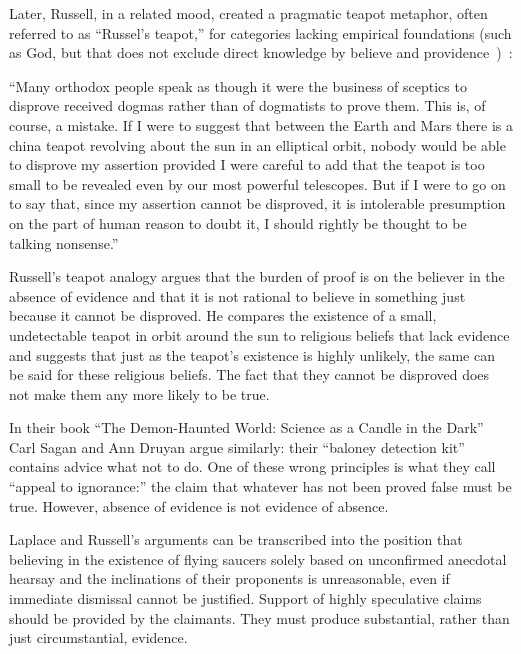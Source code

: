 Later, Russell, in a related mood, created a pragmatic teapot metaphor, often referred to as ``Russel's teapot,''
for categories lacking empirical foundations (such as God,
but that does not exclude direct knowledge by believe and providence~\cite{Sagan-Contact})~\cite{Russell1952}:
\begin{svgraybox}
``Many orthodox people speak as though it were the business of sceptics
to disprove received dogmas rather than of dogmatists to prove them. This
is, of course, a mistake. If I were to suggest that between the Earth and
Mars there is a china teapot revolving about the sun in an elliptical orbit,
nobody would be able to disprove my assertion provided I were careful to
add that the teapot is too small to be revealed even by our most powerful
telescopes. But if I were to go on to say that, since my assertion cannot be
disproved, it is intolerable presumption on the part of human reason to
doubt it, I should rightly be thought to be talking nonsense.''
\end{svgraybox}

Russell's teapot analogy argues that the burden of proof is on the believer in the absence of evidence
and that it is not rational to believe in something just because it cannot be disproved.
He compares the existence of a small, undetectable teapot in orbit around the sun to religious beliefs
that lack evidence and suggests that just as the teapot's existence is highly unlikely, the same can be said for these religious beliefs.
The fact that they cannot be disproved does not make them any more likely to be true.

In their book ``The Demon-Haunted World: Science as a Candle in the Dark''~\cite{Sagan1997Feb}  Carl Sagan  and Ann Druyan
argue similarly: their ``baloney detection kit'' contains advice what not to do. One of these wrong principles is
what they call ``appeal to ignorance:'' the claim that whatever has not been proved false must be true.
However, absence of evidence is not evidence of absence.

Laplace and Russell's arguments can be transcribed into the position that
believing in the existence of flying saucers solely based on unconfirmed anecdotal hearsay and the inclinations
of their proponents is unreasonable, even if immediate dismissal cannot be justified.
Support of highly speculative claims should be provided by the claimants.
They must produce substantial, rather than just circumstantial, evidence.



